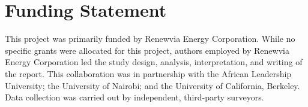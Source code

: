 \section*{Funding Statement}
This project was primarily funded by Renewvia Energy Corporation. While no specific grants were allocated for this project, authors employed by Renewvia Energy Corporation led the study design, analysis, interpretation, and writing of the report. This collaboration was in partnership with the African Leadership University; the University of Nairobi; and the University of California, Berkeley. Data collection was carried out by independent, third-party surveyors.
